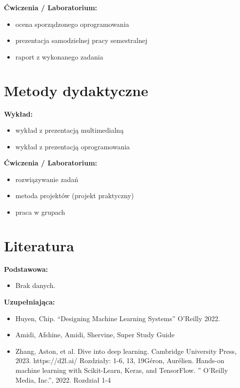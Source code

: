 \documentclass[12pt, a4paper]{article}
\begin{document}
\textbf{Ćwiczenia / Laboratorium:}
\begin{itemize}
  \item ocena sporządzonego oprogramowania
  \item prezentacja samodzielnej pracy semestralnej
  \item raport z wykonanego zadania
\end{itemize}


\section{Metody dydaktyczne}

\textbf{Wykład:}
\begin{itemize}
  \item wykład z prezentacją multimedialną
  \item wykład z prezentacją oprogramowania
\end{itemize}
\vspace{4pt}
\textbf{Ćwiczenia / Laboratorium:}
\begin{itemize}
  \item rozwiązywanie zadań
  \item metoda projektów (projekt praktyczny)
  \item praca w grupach
\end{itemize}
\vspace{4pt}


\section{Literatura}

\textbf{Podstawowa:}
\begin{itemize}
  \item Brak danych.
\end{itemize}

\textbf{Uzupełniająca:}
\begin{itemize}
  \item Huyen, Chip. “Designing Machine Learning Systems” O’Reilly 2022.
  \item Amidi, Afshine, Amidi, Shervine, Super Study Guide
  \item Zhang, Aston, et al. Dive into deep learning. Cambridge University Press, 2023. https://d2l.ai/ Rozdziały: 1-6, 13, 19Géron, Aurélien. Hands-on machine learning with Scikit-Learn, Keras, and TensorFlow. '' O'Reilly Media, Inc.'', 2022.  Rozdział 1-4
\end{itemize}
\end{document}
